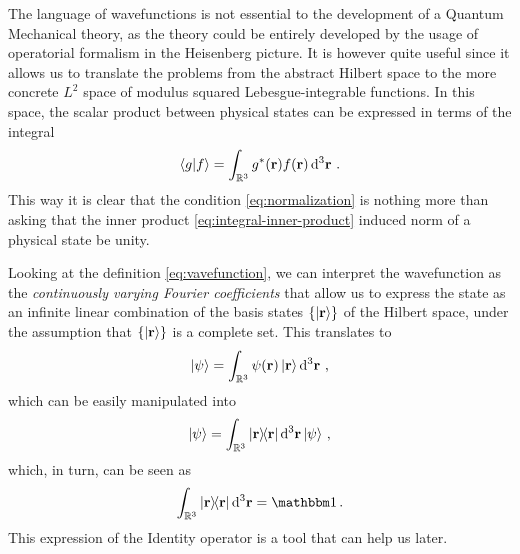             The language of wavefunctions is not essential to the development of a Quantum Mechanical theory, as the theory could be entirely developed by the usage of operatorial formalism in the Heisenberg picture. It is however quite useful since it allows us to translate the problems from the abstract Hilbert space to the more concrete $L^2$ space of modulus squared Lebesgue-integrable functions. In this space, the scalar product between physical states can be expressed in terms of the integral
            \begin{equation}
                \label{eq:integral-inner-product}
                \braket{g}{f} = \int\nolimits_{\bbR^3}g^*\pqty{\vb{r}} f\pqty{\vb{r}} \dd[3]{\vb{r}}
                \myperiod
            \end{equation}
            This way it is clear that the condition \eqref{eq:normalization} is nothing more than asking that the inner product \eqref{eq:integral-inner-product} induced norm of a physical state be unity.

            Looking at the definition \eqref{eq:vavefunction}, we can interpret the wavefunction as the \emph{continuously varying Fourier coefficients} that allow us to express the state as an infinite linear combination of the basis states $\qty{\ket{\vb{r}}}$ of the Hilbert space, under the assumption that $\qty{\ket{\vb{r}}}$ is a complete set. This translates to
            \begin{equation*}
                \ket{\psi} = \int\nolimits_{\bbR^3} \psi\pqty{\vb{r}} \ket{\vb{r}} \dd[3]{\vb{r}}
                \mycomma
            \end{equation*}
            which can be easily manipulated into
            \begin{equation*}
                \ket{\psi} = \int\nolimits_{\bbR^3} \dyad{\vb{r}}{\vb{r}} \dd[3]{\vb{r}} \ket{\psi}
                \mycomma
            \end{equation*}
            which, in turn, can be seen as
            \begin{equation}
                \label{eq:integral-identity}
                \int\nolimits_{\bbR^3} \dyad{\vb{r}}{\vb{r}} \dd[3]{\vb{r}} = \togglehat{\idM}
                \myperiod
            \end{equation}
            This expression of the Identity operator is a tool that can help us later.
        
